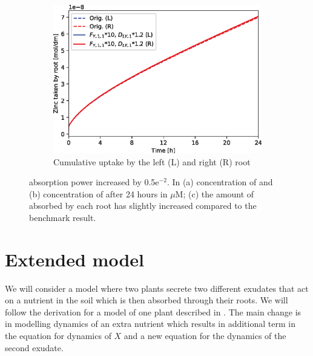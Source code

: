 \documentclass[11pt]{article}
\numberwithin{equation}{section}
\begin{document}
\begin{figure}[ht]
\begin{subfigure}[t]{0.31\textwidth}
     \caption{}
     \label{fig:absup_Zn}
     \end{subfigure}
     \begin{subfigure}[t]{0.37\textwidth}
    \includegraphics[width=\textwidth]{Figures/testpics/ZnCumulative/IncreasedZnCumu.eps}
    \caption{Cumulative  uptake by the left (L) and right (R) root}
    \label{fig:absup_cum}
    \end{subfigure}
    \caption{ absorption power increased by 0.5e$^{-2}$. In (a) concentration of  and (b) concentration of  after 24 hours in $\mu$M; (c) the amount of  absorbed by each root has slightly increased compared to the benchmark result.}
\end{figure}


\newpage


\section{Extended model}
\label{sec:Extension}
We will consider a model where two plants secrete two different exudates that act on a nutrient in the soil which is then absorbed through their roots. We will follow the derivation for a model of one plant described in \cite{Ptashnyk-2011}. The main change is in modelling dynamics of an extra nutrient which results in additional term in the equation for dynamics of $X$ and a new equation for the dynamics of the second exudate.
	
\end{document}
